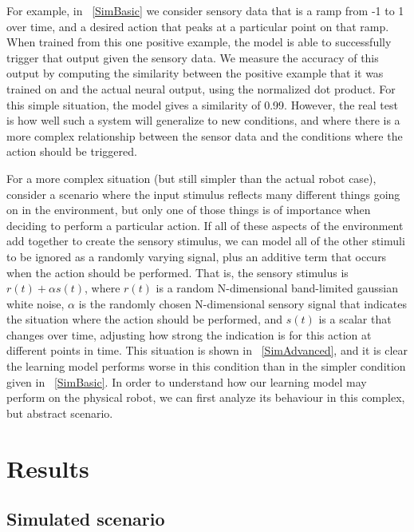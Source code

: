 \documentclass{frontiersSCNS}
\begin{document}
For example, in \figurename~\ref{SimBasic} we consider sensory data that is
a ramp from -1 to 1 over time, and a desired action that peaks at a particular
point on that ramp.  When trained from this one positive example, the model
is able to successfully trigger that output given the sensory data.  We measure
the accuracy of this output by computing the similarity between
the positive example that it was trained on and the actual neural output,
using the normalized dot product.  For this simple situation, the model gives
a similarity of 0.99.  However, the real test is how well such a system will
generalize to new conditions, and where there is a more complex relationship
between the sensor data and the conditions where the action should be triggered.

For a more complex situation (but still simpler than the actual robot case),
consider a scenario where the input stimulus reflects many different things
going on in the environment, but only one of those things is of importance
when deciding to perform a particular action.  If all of these aspects of
the environment add together to create the sensory stimulus, we can model all 
of the other stimuli to be ignored as a randomly varying signal, plus an
additive term that occurs when the action should be performed.  That is, the
sensory stimulus is $r(t) + \alpha s(t)$, where $r(t)$ is a random N-dimensional
band-limited gaussian white noise, $\alpha$ is the randomly chosen N-dimensional
sensory signal that indicates the situation where the action should be performed,
and $s(t)$ is a scalar that changes over time, adjusting how strong the
indication is for this action at different points in time.  This situation 
is shown in \figurename~\ref{SimAdvanced}, and it is clear the learning model
performs worse in this condition than in the simpler condition given in 
\figurename~\ref{SimBasic}.  In order to understand how our learning
model may perform on the physical robot, we can first analyze its behaviour 
in this complex, but abstract scenario.

\section{Results}

\subsection{Simulated scenario}
\end{document}
